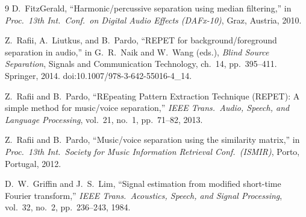 \documentclass[11pt,a4paper]{article}
\begin{document}
\begin{thebibliography}{9}
D.~FitzGerald, ``Harmonic/percussive separation using median filtering,''
in \emph{Proc.\ 13th Int.\ Conf.\ on Digital Audio Effects (DAFx-10)},
Graz, Austria, 2010.

Z.~Rafii, A.~Liutkus, and B.~Pardo, ``REPET for background/foreground
separation in audio,'' in G.~R.~Naik and W.~Wang (eds.), \emph{Blind
Source Separation}, Signals and Communication Technology, ch.~14,
pp.~395--411. Springer, 2014. doi:10.1007/978-3-642-55016-4\_14.

Z.~Rafii and B.~Pardo, ``REpeating Pattern Extraction Technique (REPET):
A simple method for music/voice separation,'' \emph{IEEE Trans.\ Audio,
Speech, and Language Processing}, vol.~21, no.~1, pp.~71--82, 2013.

Z.~Rafii and B.~Pardo, ``Music/voice separation using the similarity
matrix,'' in \emph{Proc.\ 13th Int.\ Society for Music Information
Retrieval Conf.\ (ISMIR)}, Porto, Portugal, 2012.

D.~W.~Griffin and J.~S.~Lim, ``Signal estimation from modified short-time
Fourier transform,'' \emph{IEEE Trans.\ Acoustics, Speech, and Signal
Processing}, vol.~32, no.~2, pp.~236--243, 1984.
\end{thebibliography}
\end{document}

